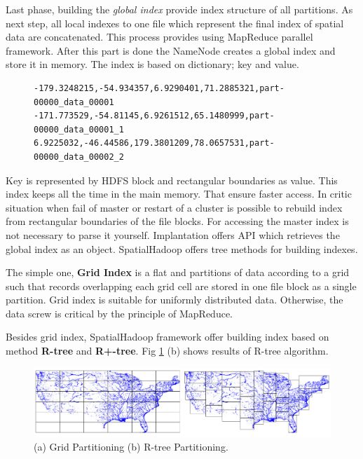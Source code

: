 \documentclass[a4paper,12pt,oneside]{report}
\begin{document}
Last phase, building the \textit{global index} provide index structure of all partitions. As next step, 
 all local indexes to one file which represent the final index of spatial data are concatenated. This process 
provides using MapReduce parallel framework.  After this part is done the NameNode creates a global index
and store it in memory. The index is based on dictionary; key and value.
\begin{figure}[h!]
\lstset{extendedchars=false,
escapeinside=''}
\begin{lstlisting}[style=mybash]
-179.3248215,-54.934357,6.9290401,71.2885321,part-00000_data_00001
-171.773529,-54.81145,6.9261512,65.1480999,part-00000_data_00001_1
6.9225032,-46.44586,179.3801209,78.0657531,part-00000_data_00002_2
\end{lstlisting}
\end{figure}
 Key is represented by HDFS block and  rectangular boundaries as value. This index keeps all the 
 time in the main memory. That ensure faster access. In critic situation when fail of master or 
 restart of a cluster is possible to rebuild index from rectangular boundaries of the file blocks. 
 For accessing the master index is not necessary to parse it yourself. Implantation offers API 
 which retrieves the global index as an object.
SpatialHadoop offers tree methods for building indexes. 

The simple one, \textbf{Grid Index} is a flat and partitions of
data according to a grid such that records overlapping each grid cell are stored in one file block 
as a single partition. Grid index is suitable for uniformly distributed data. Otherwise, the data 
screw is critical by the principle of MapReduce. 

Besides grid index, SpatialHadoop framework offer building index based on method \textbf{R-tree} and 
\textbf{ R+-tree}. Fig \ref{fig:partitioning} (b) shows results of R-tree algorithm. 

  \begin{figure}[h!]
	\centering
    \includegraphics[width=1\textwidth]{./img/spatial_hadoop_parti.png}
    \caption[Spatial Map Reduce]{\centering (a) Grid Partitioning (b) R-tree Partitioning.\footnotemark}
    \label{fig:partitioning}
  \end{figure}  
    
\end{document}
